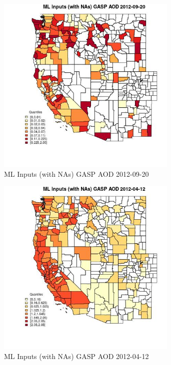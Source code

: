 \begin{figure} 
\centering  
\includegraphics[width=0.77\textwidth]{Code_Outputs/Report_ML_input_PM25_Step4_part_e_de_duplicated_aves_compiled_2019-05-14wNAs_CountyGASP_AODMean2012-09-20_2012-09-20.jpg} 
\caption{\label{fig:Report_ML_input_PM25_Step4_part_e_de_duplicated_aves_compiled_2019-05-14wNAsCountyGASP_AODMean2012-09-20_2012-09-20}ML Inputs (with NAs) GASP AOD 2012-09-20} 
\end{figure} 
 

\begin{figure} 
\centering  
\includegraphics[width=0.77\textwidth]{Code_Outputs/Report_ML_input_PM25_Step4_part_e_de_duplicated_aves_compiled_2019-05-14wNAs_CountyGASP_AODMean2012-04-12_2012-04-12.jpg} 
\caption{\label{fig:Report_ML_input_PM25_Step4_part_e_de_duplicated_aves_compiled_2019-05-14wNAsCountyGASP_AODMean2012-04-12_2012-04-12}ML Inputs (with NAs) GASP AOD 2012-04-12} 
\end{figure} 
 

